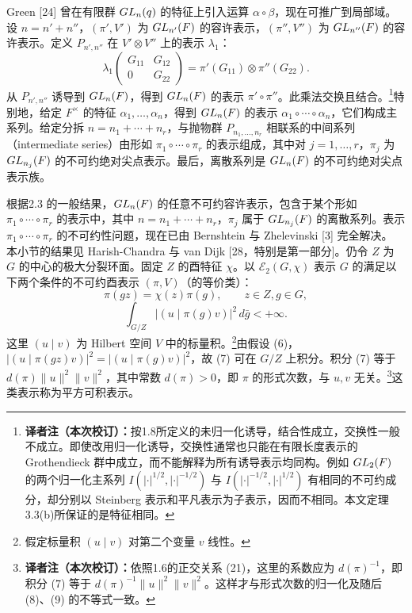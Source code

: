 Green [24] 曾在有限群 $GL_n(q)$ 的特征上引入运算 $\alpha\circ\beta$，现在可推广到局部域。设 $n=n'+n''$，$(\pi',V')$ 为 $GL_{n'}(F)$ 的容许表示，$(\pi'',V'')$ 为 $GL_{n''}(F)$ 的容许表示。定义 $P_{n',n''}$ 在 $V'\otimes V''$ 上的表示 $\lambda_1$：
\[
\lambda_1\begin{pmatrix}G_{11}&G_{12}\\0&G_{22}\end{pmatrix}
=\pi'(G_{11})\otimes\pi''(G_{22}).
\]
从 $P_{n',n''}$ 诱导到 $GL_n(F)$，得到 $GL_n(F)$ 的表示 $\pi'\circ\pi''$。此乘法交换且结合。\footnote{\textbf{译者注（本次校订）：}按1.8所定义的未归一化诱导，结合性成立，交换性一般不成立。即使改用归一化诱导，交换性通常也只能在有限长度表示的 Grothendieck 群中成立，而不能解释为所有诱导表示均同构。例如 $GL_2(F)$ 的两个归一化主系列 $I(|\cdot|^{1/2},|\cdot|^{-1/2})$ 与 $I(|\cdot|^{-1/2},|\cdot|^{1/2})$ 有相同的不可约成分，却分别以 Steinberg 表示和平凡表示为子表示，因而不相同。本文定理3.3(b)所保证的是特征相同。}特别地，给定 $F^\times$ 的特征 $\alpha_1,\ldots,\alpha_n$，得到 $GL_n(F)$ 的表示 $\alpha_1\circ\cdots\circ\alpha_n$，它们构成主系列。给定分拆 $n=n_1+\cdots+n_r$，与抛物群 $P_{n_1,\ldots,n_r}$ 相联系的中间系列（intermediate series）由形如 $\pi_1\circ\cdots\circ\pi_r$ 的表示组成，其中对 $j=1,\ldots,r$，$\pi_j$ 为 $GL_{n_j}(F)$ 的不可约绝对尖点表示。最后，离散系列是 $GL_n(F)$ 的不可约绝对尖点表示族。

根据2.3 的一般结果，$GL_n(F)$ 的任意不可约容许表示，包含于某个形如 $\pi_1\circ\cdots\circ\pi_r$ 的表示中，其中 $n=n_1+\cdots+n_r$，$\pi_j$ 属于 $GL_{n_j}(F)$ 的离散系列。表示 $\pi_1\circ\cdots\circ\pi_r$ 的不可约性问题，现在已由 Bernshtein 与 Zhelevinski [3] 完全解决。
本小节的结果见 Harish-Chandra 与 van Dijk [28，特别是第一部分]。仍令 $Z$ 为 $G$ 的中心的极大分裂环面。固定 $Z$ 的酉特征 $\chi$。以 $\mathcal E_2(G,\chi)$ 表示 $G$ 的满足以下两个条件的不可约酉表示 $(\pi,V)$（的等价类）：
\[
\pi(gz)=\chi(z)\pi(g),\qquad z\in Z,g\in G,\tag{6}
\]
\[
\int_{G/Z}|(u\mid\pi(g)v)|^2\,d\bar g<+\infty.\tag{7}
\]
这里 $(u\mid v)$ 为 Hilbert 空间 $V$ 中的标量积。\footnote{假定标量积 $(u\mid v)$ 对第二个变量 $v$ 线性。}由假设 (6)，$|(u\mid\pi(gz)v)|^2=|(u\mid\pi(g)v)|^2$，故 (7) 可在 $G/Z$ 上积分。积分 (7) 等于 $d(\pi)\|u\|^2\|v\|^2$，其中常数 $d(\pi)>0$，即 $\pi$ 的形式次数，与 $u,v$ 无关。\footnote{\textbf{译者注（本次校订）：}依照1.6的正交关系 (21)，这里的系数应为 $d(\pi)^{-1}$，即积分 (7) 等于 $d(\pi)^{-1}\|u\|^2\|v\|^2$。这样才与形式次数的归一化及随后 (8)、(9) 的不等式一致。}这类表示称为平方可积表示。

